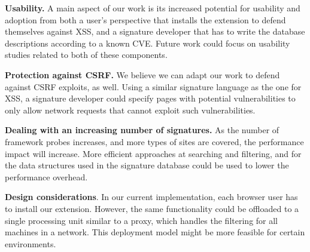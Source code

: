 \textbf{Usability.} A main aspect of our work is its increased potential for usability and adoption from both a user's perspective that installs the extension to defend themselves against \ac{XSS}, and a signature developer that has to write the database descriptions according to a known CVE. Future work could focus on usability studies related to both of these components.

\textbf{Protection against CSRF.} We believe we can adapt our work to defend against CSRF exploits, as well. Using a similar signature language as the one for \ac{XSS}, a signature developer could specify pages with potential vulnerabilities to only allow network requests that cannot exploit such vulnerabilities. 


\textbf{Dealing with an increasing number of signatures.} As the number of framework probes increases, and more types of sites are covered, the performance impact will increase. More efficient approaches at searching and filtering, and for the data structures used in the signature database could be used to lower the performance overhead.


\textbf{Design considerations}. In our current implementation, each browser user has to install our extension. However, the same functionality could be offloaded to a single processing unit similar to a proxy, which handles the filtering for all machines in a network. This deployment model might be more feasible for certain environments.


